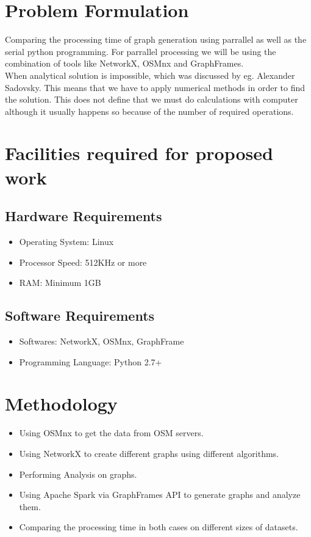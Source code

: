 \section{Problem Formulation}
 Comparing the processing time of graph generation using parrallel as well as the serial python programming. For parrallel processing we will be using the combination of tools like NetworkX, OSMnx and GraphFrames.\\
\noindent When analytical solution is impossible, which was discussed by eg. Alexander Sadovsky. This means that we have to apply numerical methods in order to find the solution. This does not define that we must do calculations with computer although it usually happens so because of the number of required operations.

\section{Facilities required for proposed work}
\subsection{Hardware Requirements}
\begin{itemize}
\item Operating System: Linux
\item Processor Speed: 512KHz or more
\item RAM: Minimum 1GB
\end{itemize}
\subsection{Software Requirements}
\begin{itemize}
\item Softwares: NetworkX, OSMnx, GraphFrame
\item Programming Language: Python 2.7+
\end{itemize}

\section{Methodology}
\begin{itemize}
\item Using OSMnx to get the data from OSM servers. 
\item Using NetworkX to create different graphs using different algorithms.
\item Performing Analysis on graphs.
\item Using Apache Spark via GraphFrames API to generate graphs and analyze them.
\item Comparing the processing time in both cases on different sizes of datasets.
\end{itemize}

